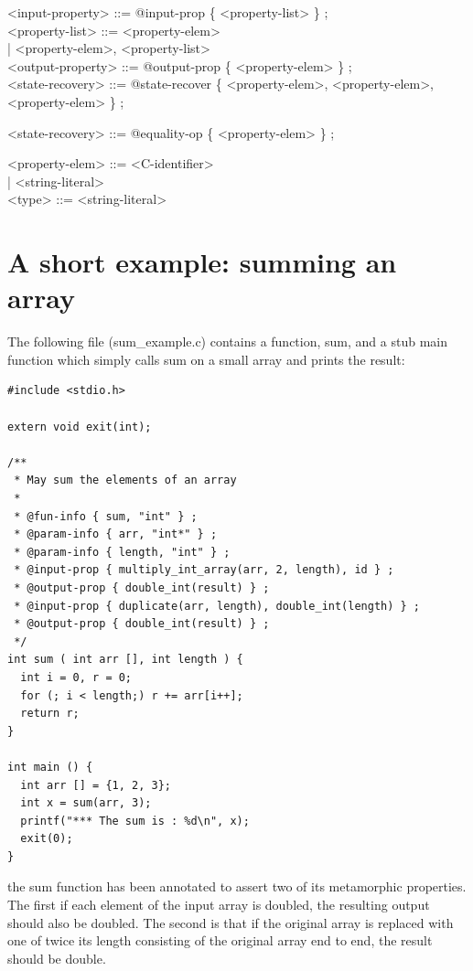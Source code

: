\documentclass[notitlepage]{article}
\begin{document}
<input-property> ::= @input-prop \{ <property-list> \} ; \\

<property-list> ::= <property-elem> \\
\phantom{1}\hspace{85pt}| <property-elem>, <property-list> \\

<output-property> ::= @output-prop \{ <property-elem> \} ; \\

<state-recovery> ::= @state-recover \{ <property-elem>, <property-elem>, <property-elem> \} ;

<state-recovery> ::= @equality-op \{ <property-elem> \} ;

<property-elem> ::= <C-identifier> \\
\phantom{1}\hspace{85pt}| <string-literal> \\

<type> ::= <string-literal>


\rmfamily

\section{A short example: summing an array}

The following file (sum\_example.c) contains a function, sum, and a stub main function which simply calls sum on a small array and prints the result:

\begin{verbatim}
#include <stdio.h>

extern void exit(int);

/**
 * May sum the elements of an array
 *
 * @fun-info { sum, "int" } ;
 * @param-info { arr, "int*" } ;
 * @param-info { length, "int" } ;
 * @input-prop { multiply_int_array(arr, 2, length), id } ;
 * @output-prop { double_int(result) } ;
 * @input-prop { duplicate(arr, length), double_int(length) } ;
 * @output-prop { double_int(result) } ;
 */
int sum ( int arr [], int length ) {
  int i = 0, r = 0;
  for (; i < length;) r += arr[i++];
  return r;
}

int main () {
  int arr [] = {1, 2, 3};
  int x = sum(arr, 3);
  printf("*** The sum is : %d\n", x);
  exit(0);
}
\end{verbatim}

the sum function has been annotated to assert two of its metamorphic properties. The first if each element of the input array is doubled, the resulting output should also be doubled. The second is that if the original array is replaced with one of twice its length consisting of the original array end to end, the result should be double.
\end{document}
